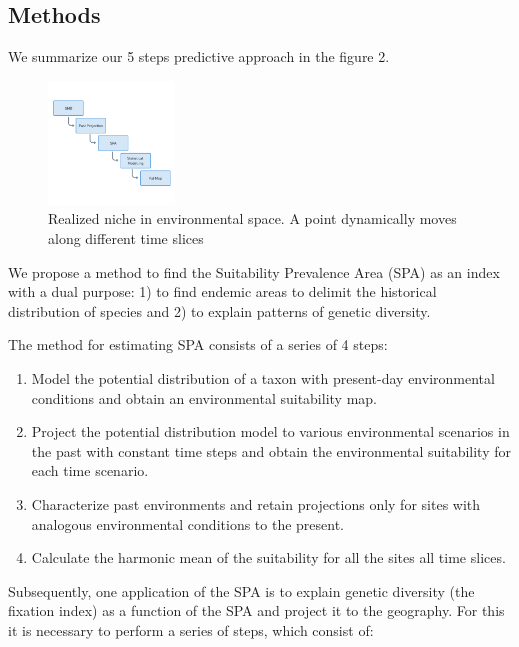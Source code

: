 \documentclass[
]{article}
\providecommand{\tightlist}{%
  \setlength{\itemsep}{0pt}\setlength{\parskip}{0pt}}
\begin{document}
\hypertarget{methods}{%
\subsection{Methods}\label{methods}}

We summarize our 5 steps predictive approach in the figure 2.

\begin{figure}
\centering
\includegraphics[width=0.3\textwidth,height=\textheight]{all_figures/figure_2.png}
\caption{Realized niche in environmental space. A point dynamically
moves along different time slices}
\end{figure}

We propose a method to find the Suitability Prevalence Area (SPA) as an
index with a dual purpose: 1) to find endemic areas to delimit the
historical distribution of species and 2) to explain patterns of genetic
diversity.

The method for estimating SPA consists of a series of 4 steps:

\begin{enumerate}
\def\labelenumi{\arabic{enumi}.}
\tightlist
\item
  Model the potential distribution of a taxon with present-day
  environmental conditions and obtain an environmental suitability map.
\item
  Project the potential distribution model to various environmental
  scenarios in the past with constant time steps and obtain the
  environmental suitability for each time scenario.
\item
  Characterize past environments and retain projections only for sites
  with analogous environmental conditions to the present.
\item
  Calculate the harmonic mean of the suitability for all the sites all
  time slices.
\end{enumerate}

Subsequently, one application of the SPA is to explain genetic diversity
(the fixation index) as a function of the SPA and project it to the
geography. For this it is necessary to perform a series of steps, which
consist of:
\end{document}
